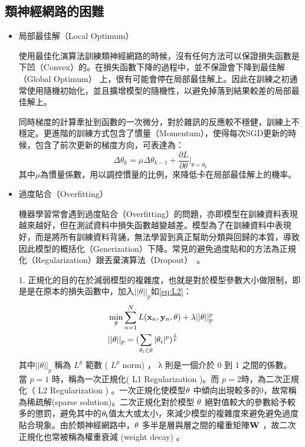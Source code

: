 \subsection{類神經網路的困難}
\begin{itemize}
\item{局部最佳解（Local Optimum）}

	使用最佳化演算法訓練類神經網路的時候，沒有任何方法可以保證損失函數是下凹（Convex）的。在損失函數下降的過程中，並不保證會下降到最佳解（Global Optimum） 上，很有可能會停在局部最佳解上。因此在訓練之初通常使用隨機初始化，並且擴增模型的隨機性，以避免掉落到結果較差的局部最佳解上。

同時梯度的計算牽扯到函數的一次微分，對於雜訊的反應較不穩健，訓練上不穩定。更進階的訓練方式包含了慣量（Momentum），使得每次SGD更新的時候，包含了前次更新的梯度方向，可表達為：
\begin{equation}
\Delta \theta_{k} =  \mu \Delta \theta_{k-1} + \frac{\partial L}{\partial \theta} \biggr|_{\theta = \theta_k}
\end{equation}
其中$\mu$為慣量係數，用以調控慣量的比例，來降低卡在局部最佳解上的機率。
\item{ 過度貼合（Overfitting）}
	
	機器學習常會遇到過度貼合（Overfitting）的問題，亦即模型在訓練資料表現越來越好，但在測試資料中損失函數越變越差。模型為了在訓練資料中表現好，而是將所有訓練資料背誦，無法學習到真正幫助分類與回歸的本質，導致因此模型的概括化（Generization）下降。常見的避免過度貼和的方法為正規化（Regularization）跟丟棄演算法（Dropout）~\cite{srivastava2014dropout}。

	1. 正規化的目的在於減弱模型的複雜度，也就是對於模型參數大小做限制，即是是在原本的損失函數中，加入$||\theta||_p$如\ref{eq:L2}：
\begin{equation}
\label{eq:L2}
\begin{aligned}
&\min_{\theta}{ \sum_{n=1}^{N}{ {L( \bold{x}_n ,\bold{y}_n,\theta)}}+\lambda||\theta||_p^p}
\\
&||\theta||_p = ( \sum_{\theta_i \in \bold{\theta}}{|\theta_i|^p} )^\frac{1}{p}
\end{aligned}
\end{equation}
其中$||\theta||_p$ 稱為 $L^p$ 範數 ( $L^ p$  norm) ， λ 則是一個介於 0 到 1 之間的係數。
當 $p = 1$ 時，稱為一次正規化( L1 Regularization )。而 $p =
2$時，為二次正規化（ L2 Regularization )
。一次正規化使模型$\bold{\theta}$
中傾向出現較多的$0$，故常稱為稀疏解(sparse solution)。二次正規化對於模型 $\bold{\theta}$ 絕對值較大的參數給予較多的懲罰，避免其中的$\bold{\theta_i}$值太大或太小，來減少模型的複雜度來避免避免過度貼合現象。由於類神經網路中，$\bold{\theta}$ 多半是層與層之間的權重矩陣$\bold{W}$ ，故二次正規化也常被稱為權重衰減 (weight
decay) 。


\end{itemize}
